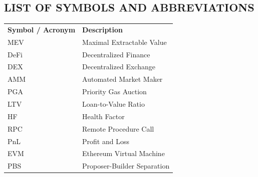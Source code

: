 

\renewcommand*\listfigurename{\size\textbf{LIST OF FIGURES}}
\listoffigures

\newpage
{}
\renewcommand*\listtablename{\size\textbf{LIST OF TABLES}}
\listoftables

\newpage
{}
\begin{center}
\section*{\size\textbf{LIST OF SYMBOLS AND ABBREVIATIONS}}  

\vspace{5mm}
\begin{tabular}{p{3.5cm} p{10cm}}
\textbf{Symbol / Acronym} & \textbf{Description} \\[1.5ex]
MEV & Maximal Extractable Value \\
DeFi & Decentralized Finance \\
DEX & Decentralized Exchange \\
AMM & Automated Market Maker \\
PGA & Priority Gas Auction \\
LTV & Loan-to-Value Ratio \\
HF & Health Factor \\
RPC & Remote Procedure Call \\
PnL & Profit and Loss \\
EVM & Ethereum Virtual Machine \\
PBS & Proposer-Builder Separation \\
\end{tabular}
\end{center}

\newpage
\renewcommand*\contentsname{\size\textbf{TABLE OF CONTENTS}}
\tableofcontents

\restoregeometry
